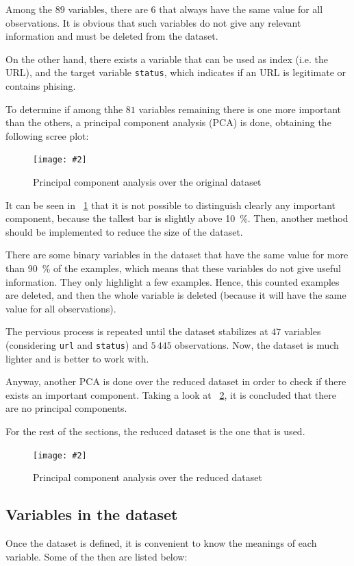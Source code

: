 \documentclass[12pt, a4paper]{article}
\newcommand*{\figref}[1]{\figurename~\ref{fig:#1}}
\newcommand{\figcaption}[4][H]{
  \begin{figure}[#1]
    \centering
    \texttt{[image: \#2]}
    \caption{#3}
    \label{fig:#2}
  \end{figure}
}
\begin{document}
    Among the $89$ variables, there are $6$ that always have the same value for all observations. It is obvious that such variables do not give any relevant information and must be deleted from the dataset.

    On the other hand, there exists a variable that can be used as index (i.e. the URL), and the target variable \texttt{status}, which indicates if an URL is legitimate or contains phising.

    To determine if among thhe $81$ variables remaining there is one more important than the others, a principal component analysis (PCA) is done, obtaining the following scree plot:

    \figcaption{pca1.png}{Principal component analysis over the original dataset}{1}

    It can be seen in \figref{pca1.png} that it is not possible to distinguish clearly any important component, because the tallest bar is slightly above \SI{10}{\percent}. Then, another method should be implemented to reduce the size of the dataset.

    There are some binary variables in the dataset that have the same value for more than \SI{90}{\percent} of the examples, which means that these variables do not give useful information. They only highlight a few examples. Hence, this counted examples are deleted, and then the whole variable is deleted (because it will have the same value for all observations).

    The pervious process is repeated until the dataset stabilizes at $47$ variables (considering \texttt{url} and \texttt{status}) and $5\,445$ observations. Now, the dataset is much lighter and is better to work with.

    Anyway, another PCA is done over the reduced dataset in order to check if there exists an important component. Taking a look at \figref{pca2.png}, it is concluded that there are no principal components.

    For the rest of the sections, the reduced dataset is the one that is used.

    \figcaption{pca2.png}{Principal component analysis over the reduced dataset}{1}

    \subsection{Variables in the dataset}

      Once the dataset is defined, it is convenient to know the meanings of each variable. Some of the then are listed below:
\end{document}
